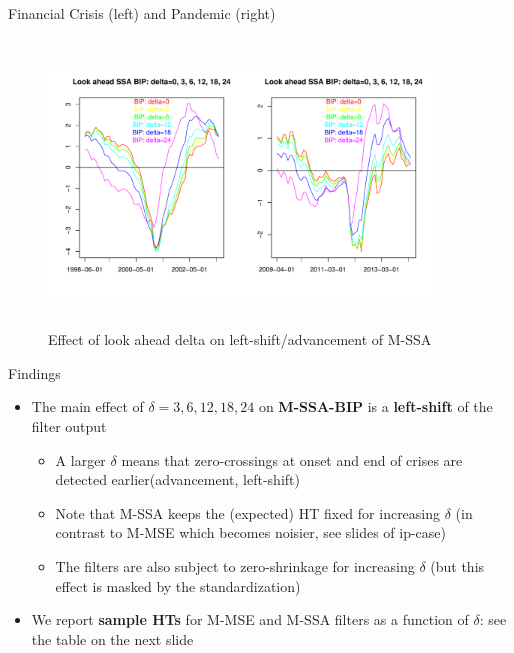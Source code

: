 \documentclass{beamer}
\begin{document}
\begin{frame} {Financial Crisis (left) and Pandemic (right)}
\begin{figure}[H]\begin{center}\includegraphics[height=3in, width=4in]{look_ahead_ssa_2.pdf}\caption{Effect of look ahead delta on  left-shift/advancement of M-SSA\label{cor}}\end{center}\end{figure}\end{frame}







\begin{frame} {Findings}
\begin{itemize}
\item The main effect of $\delta=3, 6, 12, 18, 24$ on \textbf{M-SSA-BIP} is a \textbf{left-shift} of the filter output 
\begin{itemize}
\item A larger $\delta$  means that zero-crossings at onset and end of crises are detected earlier(advancement, left-shift)
\item Note that M-SSA keeps the (expected) HT fixed for increasing $\delta$ (in contrast to M-MSE which becomes noisier, see slides of ip-case)
\item The filters are also subject to zero-shrinkage for increasing $\delta$ (but this effect is masked by the standardization) 
\end{itemize}
\item We report \textbf{sample HTs} for M-MSE and M-SSA filters as a function of $\delta$: see the table on the next slide

\end{itemize}

\end{frame}
\end{document}

